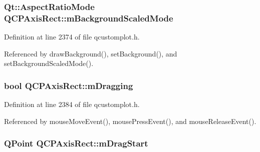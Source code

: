 \hypertarget{class_q_c_p_axis_rect_a859fd368e794663e346b4f53f35078e9}{}
\subsubsection[{m\+Background\+Scaled\+Mode}]{\setlength{\rightskip}{0pt plus 5cm}Qt\+::\+Aspect\+Ratio\+Mode Q\+C\+P\+Axis\+Rect\+::m\+Background\+Scaled\+Mode\hspace{0.3cm}{\ttfamily [protected]}}\label{class_q_c_p_axis_rect_a859fd368e794663e346b4f53f35078e9}


Definition at line 2374 of file qcustomplot.\+h.



Referenced by draw\+Background(), set\+Background(), and set\+Background\+Scaled\+Mode().

\hypertarget{class_q_c_p_axis_rect_ab49a6698194cf0e9e38a1d734c0888a8}{}
\subsubsection[{m\+Dragging}]{\setlength{\rightskip}{0pt plus 5cm}bool Q\+C\+P\+Axis\+Rect\+::m\+Dragging\hspace{0.3cm}{\ttfamily [protected]}}\label{class_q_c_p_axis_rect_ab49a6698194cf0e9e38a1d734c0888a8}


Definition at line 2384 of file qcustomplot.\+h.



Referenced by mouse\+Move\+Event(), mouse\+Press\+Event(), and mouse\+Release\+Event().

\hypertarget{class_q_c_p_axis_rect_a032896b28f83a58010d8d533b78c49df}{}
\subsubsection[{m\+Drag\+Start}]{\setlength{\rightskip}{0pt plus 5cm}Q\+Point Q\+C\+P\+Axis\+Rect\+::m\+Drag\+Start\hspace{0.3cm}{\ttfamily [protected]}}\label{class_q_c_p_axis_rect_a032896b28f83a58010d8d533b78c49df}


